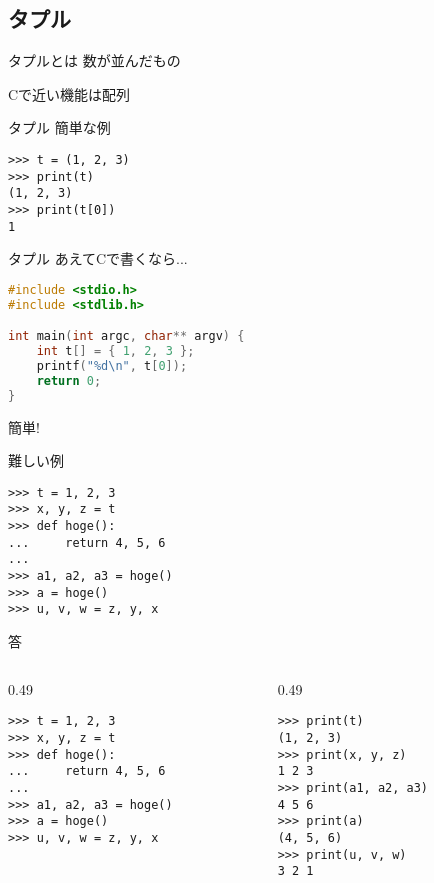 \documentclass[12pt, xetex, xcolor=pdftex, dvipsnames]{beamer}
\begin{document}
\subsection{タプル}
\begin{frame}{タプルとは}
    数が並んだもの

    Cで近い機能は配列
\end{frame}
\begin{frame}[fragile]{タプル}
    簡単な例
    \begin{lstlisting}
>>> t = (1, 2, 3)
>>> print(t)
(1, 2, 3)
>>> print(t[0])
1
    \end{lstlisting}
\end{frame}
\begin{frame}[fragile]{タプル}
    あえてCで書くなら...
    \begin{lstlisting}[language={C}]
#include <stdio.h>
#include <stdlib.h>

int main(int argc, char** argv) {
    int t[] = { 1, 2, 3 };
    printf("%d\n", t[0]);
    return 0;
}
    \end{lstlisting}
    簡単!
\end{frame}
\begin{frame}[fragile]{難しい例}
\begin{lstlisting}
>>> t = 1, 2, 3
>>> x, y, z = t
>>> def hoge():
...     return 4, 5, 6
...
>>> a1, a2, a3 = hoge()
>>> a = hoge()
>>> u, v, w = z, y, x
\end{lstlisting}
\end{frame}
\begin{frame}[fragile]{答}
    \begin{columns}[t]
        \begin{column}{0.49\hsize}
\begin{lstlisting}
>>> t = 1, 2, 3
>>> x, y, z = t
>>> def hoge():
...     return 4, 5, 6
...
>>> a1, a2, a3 = hoge()
>>> a = hoge()
>>> u, v, w = z, y, x
\end{lstlisting}
        \end{column}
        \begin{column}{0.49\hsize}
\begin{lstlisting}
>>> print(t)
(1, 2, 3)
>>> print(x, y, z)
1 2 3
>>> print(a1, a2, a3)
4 5 6
>>> print(a)
(4, 5, 6)
>>> print(u, v, w)
3 2 1
\end{lstlisting}
        \end{column}
    \end{columns}
\end{frame}
\end{document}
